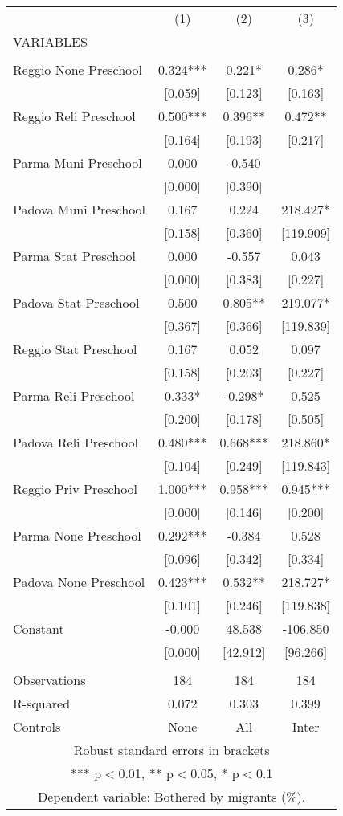 \begin{tabular}{lccc} \hline
 & (1) & (2) & (3) \\
VARIABLES &  &  &  \\ \hline
 &  &  &  \\
Reggio None Preschool & 0.324*** & 0.221* & 0.286* \\
 & [0.059] & [0.123] & [0.163] \\
Reggio Reli Preschool & 0.500*** & 0.396** & 0.472** \\
 & [0.164] & [0.193] & [0.217] \\
Parma Muni Preschool & 0.000 & -0.540 &  \\
 & [0.000] & [0.390] &  \\
Padova Muni Preschool & 0.167 & 0.224 & 218.427* \\
 & [0.158] & [0.360] & [119.909] \\
Parma Stat Preschool & 0.000 & -0.557 & 0.043 \\
 & [0.000] & [0.383] & [0.227] \\
Padova Stat Preschool & 0.500 & 0.805** & 219.077* \\
 & [0.367] & [0.366] & [119.839] \\
Reggio Stat Preschool & 0.167 & 0.052 & 0.097 \\
 & [0.158] & [0.203] & [0.227] \\
Parma Reli Preschool & 0.333* & -0.298* & 0.525 \\
 & [0.200] & [0.178] & [0.505] \\
Padova Reli Preschool & 0.480*** & 0.668*** & 218.860* \\
 & [0.104] & [0.249] & [119.843] \\
Reggio Priv Preschool & 1.000*** & 0.958*** & 0.945*** \\
 & [0.000] & [0.146] & [0.200] \\
Parma None Preschool & 0.292*** & -0.384 & 0.528 \\
 & [0.096] & [0.342] & [0.334] \\
Padova None Preschool & 0.423*** & 0.532** & 218.727* \\
 & [0.101] & [0.246] & [119.838] \\
Constant & -0.000 & 48.538 & -106.850 \\
 & [0.000] & [42.912] & [96.266] \\
 &  &  &  \\
Observations & 184 & 184 & 184 \\
R-squared & 0.072 & 0.303 & 0.399 \\
 Controls & None & All & Inter \\ \hline
\multicolumn{4}{c}{ Robust standard errors in brackets} \\
\multicolumn{4}{c}{ *** p$<$0.01, ** p$<$0.05, * p$<$0.1} \\
\multicolumn{4}{c}{ Dependent variable: Bothered by migrants (\%).} \\
\end{tabular}
